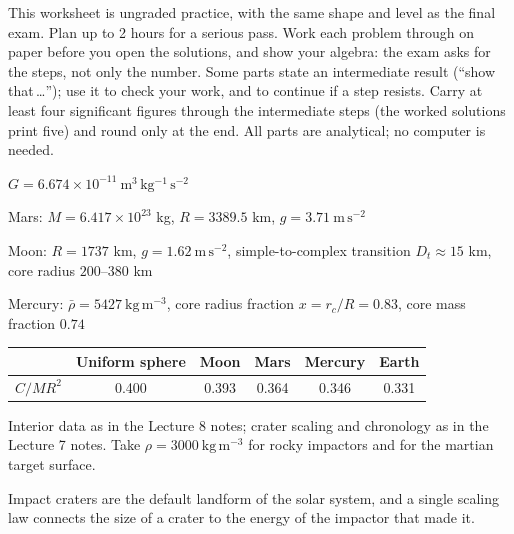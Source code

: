 
\ipsmaketitle

This worksheet is ungraded practice, with the same shape and level as the final exam.
Plan up to 2 hours for a serious pass.
Work each problem through on paper before you open the solutions, and show your algebra:
the exam asks for the steps, not only the number.
Some parts state an intermediate result (``show that\,\ldots''); use it to check your work, and to continue if a step resists.
Carry at least four significant figures through the intermediate steps (the worked solutions print five) and round only at the end.
All parts are analytical; no computer is needed.

\begin{given}
$G = 6.674 \times 10^{-11}\ \mathrm{m^3\,kg^{-1}\,s^{-2}}$

\vskip4pt
Mars: $M = 6.417 \times 10^{23}$ kg, $R = 3389.5$ km, $g = 3.71\ \mathrm{m\,s^{-2}}$

\vskip4pt
Moon: $R = 1737$ km, $g = 1.62\ \mathrm{m\,s^{-2}}$, simple-to-complex transition $D_t \approx 15$ km, core radius $200$--$380$ km

\vskip4pt
Mercury: $\bar\rho = 5427\ \mathrm{kg\,m^{-3}}$, core radius fraction $x = r_c/R = 0.83$, core mass fraction $0.74$

\vskip6pt
\begin{tabular}{@{}lccccc@{}}
\toprule
 & Uniform sphere & Moon & Mars & Mercury & Earth \\
\midrule
$C/MR^2$ & 0.400 & 0.393 & 0.364 & 0.346 & 0.331 \\
\bottomrule
\end{tabular}

\vskip4pt
{\footnotesize Interior data as in the Lecture 8 notes; crater scaling and chronology as in the Lecture 7 notes. Take $\rho = 3000\ \mathrm{kg\,m^{-3}}$ for rocky impactors and for the martian target surface.}
\end{given}



Impact craters are the default landform of the solar system,
and a single scaling law connects the size of a crater to the energy of the impactor that made it.

